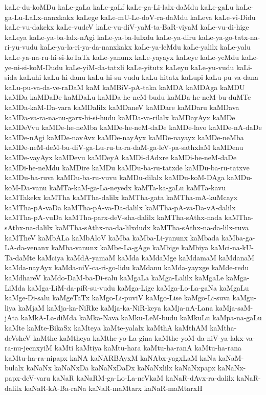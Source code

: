 {kaLe-du-koMDu
kaLe-gaLa
kaLe-gaLf
kaLe-ga-Li-lalx-daMdu
kaLe-gaLu
kaLe-ga-Lu-LaLx-nanxkakx
kaLege
kaLe-mU-Le-doV-ra-daMdu
kaLeva
kaLe-vi-Didu
kaLe-vu-dakekx
kaLe-vudeV
kaLe-vu-diV-yaM-ta-BaR-viyaM
kaLe-vu-di-hige
kaLeya
kaLe-ya-ba-lalx-nAgi
kaLe-ya-ba-lulxdu
kaLe-ya-diru
kaLe-ya-go-tatx-na-ri-yu-vudu
kaLe-ya-la-ri-ya-da-nanxkakx
kaLe-ya-leMdu
kaLe-yalilx
kaLe-yalu
kaLe-ya-na-ru-hi-si-koTaTx
kaLe-yanunx
kaLe-yayayx
kaLeye
kaLe-yeMdu
kaLe-ye-ni-si-koM-Dudu
kaLe-yiM-da-tatxli
kaLe-yitutx
kaLeyu
kaLe-yu-vudu
kaLi-sida
kaLuhi
kaLu-hi-danu
kaLu-hi-su-vudu
kaLu-hitatx
kaLupi
kaLu-pu-va-dana
kaLu-pu-va-da-ve-raDaM
kaM
kaMBiV-pA-taka
kaMDA
kaMDAga
kaMDU
kaMDa
kaMDaDe
kaMDaLu
kaMDa-he-neM-budu
kaMDa-he-neM-bu-duMTe
kaMDa-kaM-Da-vara
kaMDalilx
kaMDaneV
kaMDare
kaMDaru
kaMDava
kaMDa-va-ra-na-nu-garx-hi-si-hudu
kaMDa-va-rilalx
kaMDayAyx
kaMDe
kaMDeVvu
kaMDe-he-neMba
kaMDe-he-neM-daDe
kaMDe-lavo
kaMDe-nA-daDe
kaMDe-nAgi
kaMDe-navAvx
kaMDe-nayAyx
kaMDe-nayayx
kaMDe-neMba
kaMDe-neM-deM-bu-diV-ga-Lu-ru-ta-ra-daM-ga-leV-pa-sathxlaM
kaMDenu
kaMDe-vayAyx
kaMDevu
kaMDeyA
kaMDi-dAdxre
kaMDi-he-neM-daDe
kaMDi-he-neMdu
kaMDire
kaMDu
kaMDu-ba-ru-tatxde
kaMDu-ba-ru-tatxve
kaMDu-ba-ruva
kaMDu-ba-ru-vuvu
kaMDu-dilalx
kaMDu-koM-DAga
kaMDu-koM-Da-vanu
kaMTa-kaM-ga-La-neyedx
kaMTa-ka-gaLu
kaMTa-kavu
kaMTakekx
kaMTha
kaMTha-dalilx
kaMTha-gata
kaMTha-mA-kuMcayx
kaMTha-pA-vaDa
kaMTha-pA-va-Da-dalilx
kaMTha-pA-va-Da-vA-dalilx
kaMTha-pA-vuDa
kaMTha-parx-deV-sha-dalilx
kaMTha-sAthx-nada
kaMTha-sAthx-na-dalilx
kaMTha-sAthx-na-da-lilxdudx
kaMTha-sAthx-na-da-lilx-ruva
kaMTheV
kaMbALa
kaMbAloV
kaMba
kaMba-Li-yanunx
kaMbada
kaMba-ga-LA-da-venanx
kaMba-vanunx
kaMbe-La-gAge
kaMbige
kaMbiya
kaMci-na-kU-Ta-daMte
kaMciya
kaMdA-yamaM
kaMda
kaMdaMge
kaMdamaM
kaMdanaM
kaMda-nayAyx
kaMda-niV-ca-ri-go-lidu
kaMdanu
kaMda-yayxge
kaMde-redu
kaMdhareV
kaMdo-DaM-ba-Di-salu
kaMgaLa
kaMga-Lalilx
kaMgaLe
kaMga-LiMda
kaMga-LiM-da-piR-su-vudu
kaMga-Lige
kaMga-Lo-La-gaNa
kaMgaLu
kaMge-Di-salu
kaMgeTaTx
kaMgo-Li-puviV
kaMgo-Lise
kaMgo-Li-suva
kaMgu-liya
kaMjaM
kaMja-ka-NiRke
kaMja-ka-NiR-keya
kaMja-nA-Lana
kaMja-saM-jAta
kaMkA-La-diMda
kaMka-Nava
kaMku-LeM-budu
kaMkuLu
kaMpa-na-gaLu
kaMte
kaMte-BikaSx
kaMteya
kaMte-yalalx
kaMthA
kaMthAM
kaMtha-deVsheV
kaMthe
kaMtheya
kaMthe-yo-La-gina
kaMthe-yoM-da-niV-ya-lakx-va-ra-nu-jecnxyiM
kaMti
kaMtiya
kaMtu-hara
kaMtu-ha-ranA
kaMtu-ha-rana
kaMtu-ha-ra-nipapx
kaNA
kaNARBAyxM
kaNAbx-yagxLaM
kaNa
kaNaM-bulalx
kaNaNx
kaNaNxDa
kaNaNxDaDx
kaNaNxlilx
kaNaNxpapx
kaNaNx-papx-deV-varu
kaNaR
kaNaRM-ga-Lo-La-neVkaM
kaNaR-dAvx-ra-dalilx
kaNaR-dalilx
kaNaR-kA-Ba-raNa
kaNaR-maMtarx
kaNaR-maMtarxH
}
